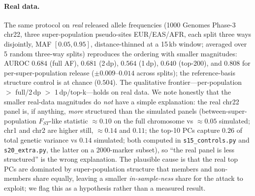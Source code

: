 \documentclass[11pt]{article}
\begin{document}
\paragraph{Real data.} The same protocol on \emph{real} released allele
frequencies (1000 Genomes Phase-3 chr22, three super-population pseudo-sites
EUR/EAS/AFR, each split three ways disjointly, MAF $[0.05,0.95]$,
distance-thinned at a 15\,kb window; averaged over 5 random three-way splits)
reproduces the ordering with smaller magnitudes: AUROC $0.684$ (full AF), $0.681$
(2\,dp), $0.564$ (1\,dp), $0.640$ (top-200), and $0.808$ for per-super-population
release ($\pm 0.009$--$0.014$ across splits); the reference-basis structure
control is at chance ($0.504$). The qualitative frontier---per-population $>$
full/2\,dp $>$ 1\,dp/top-k---holds on real data. We note honestly that the
smaller real-data magnitudes do \emph{not} have a simple explanation: the real
chr22 panel is, if anything, \emph{more} structured than the simulated panels
(between-super-population $F_{ST}$-like statistic $\approx 0.10$ on the full
chromosome vs $\approx 0.05$ simulated; chr1 and chr2 are higher still,
$\approx 0.14$ and $0.11$; the top-10 PCs capture $0.26$ of total genetic
variance vs $0.14$ simulated; both computed in \texttt{s15\_controls.py} and
\texttt{s20\_extra.py}, the latter on a 2000-marker subset), so ``the real
panel is less structured'' is the wrong
explanation. The plausible cause is that
the real top PCs are dominated by super-population structure that members and
non-members share equally, leaving a smaller \emph{in-sample-ness} share for the
attack to exploit; we flag this as a hypothesis rather than a measured result.
\end{document}
